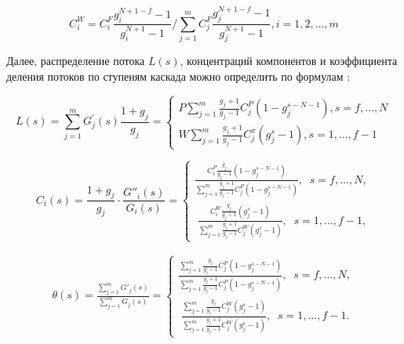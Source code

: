 \begin{equation} \label{EQ__1_58_} 
  C_{i}^{W}=C_{i}^{F} \frac{g_{i}^{N+1-f}-1}{g_{i}^{N+1}-1} / \sum_{j=1}^{m} C_{j}^{F} \frac{g_{j}^{N+1-f}-1}{g_{j}^{N+1}-1}, i=1,2, \ldots, m                         
\end{equation} 

Далее, распределение потока $L(s)$, концентраций компонентов и коэффициента деления потоков по ступеням каскада можно определить по формулам \cite{sulaberidzeTeoriyaKaskadovDlya2011}:

\begin{equation} \label{EQ__1_59_} 
L(s)=\sum_{j=1}^{m} G_{j}^{\prime}(s) \frac{1+g_{j}}{g_{j}}=\left\{\begin{array}{c}
  P \sum_{j=1}^{m} \frac{g_{j}+1}{g_{j}-1} C_{j}^{P}\left(1-g_{j}^{s-N-1}\right), s=f, \ldots, N \\
  W \sum_{j=1}^{m} \frac{g_{j}+1}{g_{j}-1} C_{j}^{\pi}\left(g_{j}^{s}-1\right), s=1, \ldots, f-1
  \end{array}\right.
\end{equation} 

\begin{equation} \label{EQ__1_60_} 
C_{i} (s)=\frac{1+g_{j} }{g_{j} } \cdot \frac{G''_{i} (s)}{G_{i} (s)} =\left\{\begin{array}{l} {\frac{C_{i}^{P} \frac{g_{j} }{g_{j} -1} \left(1-g_{j}^{s-N-1} \right)}{\sum _{j=1}^{m}\frac{g_{j} +1}{g_{j} -1}  C_{j}^{P} \left(1-g_{j}^{s-N-1} \right)} ,\; \; s=f,...,N,} \\ {\; \frac{C_{i}^{W} \frac{g_{j} }{g_{j} -1} \left(g_{j}^{s} -1\right)}{\sum _{j=1}^{m}\frac{g_{j} +1}{g_{j} -1}  C_{j}^{W} \left(g_{j}^{s} -1\right)} ,\; \; s=1,...,f-1,} \end{array}\right.  
\end{equation} 

\begin{equation} \label{EQ__1_61_} 
\begin{array}{l} {\theta (s)=\frac{\sum _{j=1}^{m}G'_{j} (s) }{\sum _{j=1}^{m}G_{j} (s) } =\left\{\begin{array}{l} {\frac{\sum _{j=1}^{m}\frac{g_{j} }{g_{j} -1} C_{j}^{P} \left(1-g_{j}^{s-N-1} \right) }{\sum _{j=1}^{m}\frac{g_{j} +1}{g_{j} -1}  C_{j}^{P} \left(1-g_{j}^{s-N-1} \right)} ,\; \; s=f,...,N,} \\ {\; \frac{\sum _{j=1}^{m}\frac{g_{j} }{g_{j} -1} C_{j}^{W} \left(g_{j}^{s} -1\right) }{\sum _{j=1}^{m}\frac{g_{j} +1}{g_{j} -1}  C_{j}^{W} \left(g_{j}^{s} -1\right)} ,\; \; s=1,...,f-1.} \end{array}\right. } \\ {\; } \end{array} 
\end{equation}

